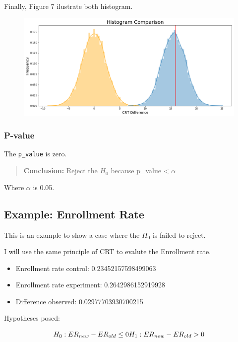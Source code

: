 \documentclass[]{book}
\providecommand{\tightlist}{%
  \setlength{\itemsep}{0pt}\setlength{\parskip}{0pt}}
\begin{document}
Finally, Figure 7 ilustrate both histogram.

\begin{figure}
\centering
\includegraphics{01-img/c4_l13_07.png}
\caption{}
\end{figure}

\subsubsection*{P-value}\label{p-value-2}

The \texttt{p\_value} is zero.

\begin{quote}
\textbf{Conclusion:} Reject the \(H_0\) because p\_value \textless{}
\(\alpha\)
\end{quote}

Where \(\alpha\) is 0.05.

\subsection{Example: Enrollment Rate}\label{example-enrollment-rate}

This is an example to show a case where the \(H_0\) is failed to reject.

I will use the same principle of CRT to evalute the Enrollment rate.

\begin{itemize}
\tightlist
\item
  Enrollment rate control: 0.23452157598499063
\item
  Enrollment rate experiment: 0.2642986152919928
\item
  Difference observed: 0.02977703930700215
\end{itemize}

Hypotheses posed:

\[H_0 : ER_{new} - ER_{old} \leq 0 \\
  H_1 : ER_{new} - ER_{old} > 0\]
\end{document}
